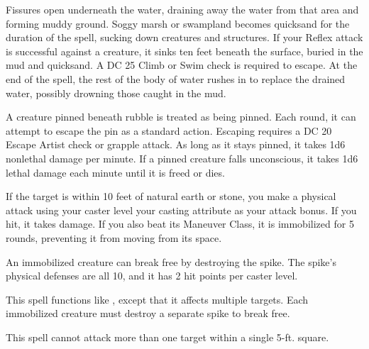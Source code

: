 \begin{spelleffect}
  \par {} Fissures open underneath the water, draining away the water from that area and forming muddy ground. Soggy marsh or swampland becomes quicksand for the duration of the spell, sucking down creatures and structures.  If your Reflex attack is successful against a creature, it sinks ten feet beneath the surface, buried in the mud and quicksand. A DC 25 Climb or Swim check is required to escape. At the end of the spell, the rest of the body of water rushes in to replace the drained water, possibly drowning those caught in the mud.
\end{spelleffect}
\begin{spellnotes}
    A creature pinned beneath rubble is treated as being pinned. Each round, it can attempt to escape the pin as a standard action. Escaping requires a DC 20 Escape Artist check or grapple attack. As long as it stays pinned, it takes 1d6 nonlethal damage per minute. If a pinned creature falls unconscious, it takes 1d6 lethal damage each minute until it is freed or dies.
\end{spellnotes}

\spellrng{\rngmed}
\begin{spelleffect}
    If the target is within 10 feet of natural earth or stone, you make a physical attack using your caster level \add your casting attribute as your attack bonus. If you hit, it takes damage. If you also beat its Maneuver Class, it is immobilized for 5 rounds, preventing it from moving from its space.

    An immobilized creature can break free by destroying the spike. The spike's physical defenses are all 10, and it has 2 hit points per caster level.
\end{spelleffect}

\begin{spelleffect}
    This spell functions like , except that it affects multiple targets. Each immobilized creature must destroy a separate spike to break free. 
\end{spelleffect}
\begin{spellnotes}
    This spell cannot attack more than one target within a single 5-ft. square.
\end{spellnotes}

